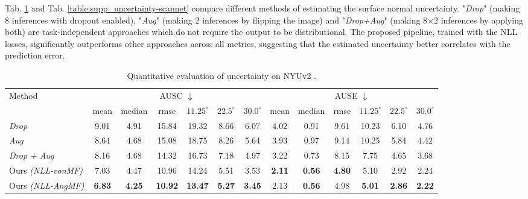 \documentclass[10pt,twocolumn,letterpaper]{article}
\begin{document}
Tab. \ref{table:supp_uncertainty-nyu} and Tab. \ref{table:supp_uncertainty-scannet} compare different methods of estimating the surface normal uncertainty. "\textit{Drop}" (making 8 inferences with dropout enabled), "\textit{Aug}" (making 2 inferences by flipping the image) and "\textit{Drop+Aug}" (making 8$\times$2 inferences by applying both) are task-independent approaches which do not require the output to be distributional. The proposed pipeline, trained with the NLL losses, significantly outperforms other approaches across all metrics, suggesting that the estimated uncertainty better correlates with the prediction error.

\begin{table}[h]
\normalsize
\setlength\tabcolsep{1.5pt}
\begin{center}
\begin{tabular}{l|cccccc|cccccc}
\toprule
\multirow{2}{4em}{Method} & \multicolumn{6}{c|}{AUSC $\downarrow$} &
\multicolumn{6}{c}{AUSE $\downarrow$}\\
\cline{2-13}
& {\small mean} & {\small median} & {\small rmse} & {\footnotesize $ 11.25^{\circ}$} & {\footnotesize $ 22.5^{\circ}$} & {\footnotesize $ 30.0^{\circ}$} & {\small mean} & {\small median} & {\small rmse} & {\footnotesize $11.25^{\circ}$} & {\footnotesize $22.5^{\circ}$} & {\footnotesize $30.0^{\circ}$}\\
\midrule
\textit{Drop}
& 9.01 & 4.91 & 15.84 & 19.32 & 8.66 & 6.07
& 4.02 & 0.91 & 9.61 & 10.23 & 6.10 & 4.76\\
\textit{Aug} 
& 8.64 & 4.68 & 15.08 & 18.75 & 8.26 & 5.64
& 3.93 & 0.97 & 9.14 & 10.25 & 5.84 & 4.42\\
\textit{Drop + Aug} 
& 8.16 & 4.68 & 14.32 & 16.73 & 7.18 & 4.97
& 3.22 & 0.73 & 8.15 & 7.75 & 4.65 & 3.68\\
\hline
Ours \textit{(NLL-vonMF)} 
& 7.03 & 4.47 & 10.96 & 14.24 & 5.51 & 3.53
& \textbf{2.11} & \textbf{0.56} & \textbf{4.80} & 5.10 & 2.92 & 2.24\\
Ours \textit{(NLL-AngMF)} 
& \textbf{6.83} & \textbf{4.25} & \textbf{10.92} & \textbf{13.47} & \textbf{5.27} & \textbf{3.45}
& 2.13 & \textbf{0.56} & 4.98 & \textbf{5.01} & \textbf{2.86} & \textbf{2.22}\\
\bottomrule
\end{tabular}
\end{center}
\caption{Quantitative evaluation of uncertainty on NYUv2 \cite{NYUv2}.}
\label{table:supp_uncertainty-nyu}
\end{table}
\end{document}
